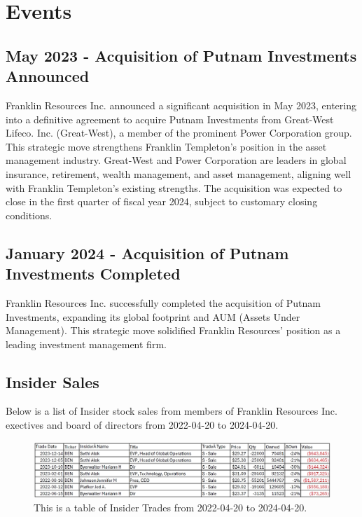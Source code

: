 \documentclass[9pt,a4paper,twoside]{tau}
\begin{document}
\section{Events}

    \subsection{May 2023 - Acquisition of Putnam Investments Announced}
	
        Franklin Resources Inc. announced a significant acquisition in May 2023, entering into a definitive agreement to acquire Putnam Investments from Great-West Lifeco. Inc. (Great-West), a member of the prominent Power Corporation group. This strategic move strengthens Franklin Templeton's position in the asset management industry. Great-West and Power Corporation are leaders in global insurance, retirement, wealth management, and asset management, aligning well with Franklin Templeton's existing strengths. The acquisition was expected to close in the first quarter of fiscal year 2024, subject to customary closing conditions.

    \subsection{January 2024 - Acquisition of Putnam Investments Completed}
	
        Franklin Resources Inc. successfully completed the acquisition of Putnam Investments, expanding its global footprint and AUM (Assets Under Management). This strategic move solidified Franklin Resources' position as a leading investment management firm.
    
    \subsection{Insider Sales}
    Below is a list of Insider stock sales from members of Franklin Resources Inc. exectives and board of directors from 2022-04-20 to 2024-04-20.
    
    
    \begin{figure}[H]
        \centering
        \includegraphics[width=0.95\columnwidth]{images/InsiderTrades.jpg}
        \caption{This is a table of Insider Trades from 2022-04-20 to 2024-04-20.}
        \label{fig:figure}
    \end{figure}
\end{document}
